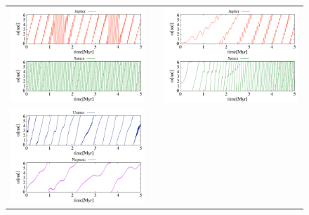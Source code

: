 \documentclass[11pt,a4paper,oneside,onecolumn]{jarticle}
\begin{document}
\begin{figure}[H]
\begin{tabular}{ccc}
\begin{minipage}[t]{0.45\hsize}
\centering
\includegraphics[width=8cm]{./image/NoMove_smallomega_5Myr_JUPSAT.pdf}
\end{minipage} &
\begin{minipage}[t]{0.1\hsize}
\end{minipage} &
\begin{minipage}[t]{0.45\hsize}
\centering
\includegraphics[width=8cm]{./image/Move500kyr_smallomega_5Myr_JUPSAT.pdf}
\end{minipage}\\
\begin{minipage}[t]{0.45\hsize}
\centering
\includegraphics[width=8cm]{./image/NoMove_smallomega_5Myr_URANEP.pdf}
\end{minipage} &

\end{tabular}
\end{figure}
\end{document}

